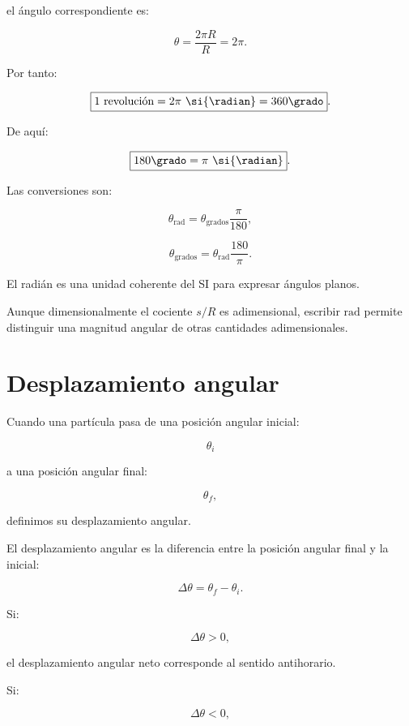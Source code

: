 el ángulo correspondiente es:

\[
\theta
=
\frac{2\pi R}{R}
=
2\pi.
\]

Por tanto:

\[
\boxed{
1\text{ revolución}
=
2\pi\ \si{\radian}
=
360\grado
}.
\]

De aquí:

\[
\boxed{
180\grado=\pi\ \si{\radian}
}.
\]

Las conversiones son:

\[
\theta_{\mathrm{rad}}
=
\theta_{\mathrm{grados}}
\frac{\pi}{180},
\]

\[
\theta_{\mathrm{grados}}
=
\theta_{\mathrm{rad}}
\frac{180}{\pi}.
\]

\begin{interpretacion}

El radián es una unidad coherente del SI para expresar ángulos planos.

Aunque dimensionalmente el cociente \(s/R\) es adimensional, escribir
\(\si{\radian}\) permite distinguir una magnitud angular de otras cantidades
adimensionales.

\end{interpretacion}


\section{Desplazamiento angular}

Cuando una partícula pasa de una posición angular inicial:

\[
\theta_i
\]

a una posición angular final:

\[
\theta_f,
\]

definimos su desplazamiento angular.

\begin{definicion}

El desplazamiento angular es la diferencia entre la posición angular final y
la inicial:

\[
\boxed{
\Delta\theta=\theta_f-\theta_i
}.
\]

\end{definicion}

Si:

\[
\Delta\theta>0,
\]

el desplazamiento angular neto corresponde al sentido antihorario.

Si:

\[
\Delta\theta<0,
\]


